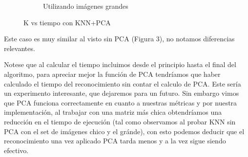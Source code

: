 \begin{figure}[H]
\begin{subfigure}[h]{0.62\linewidth}
\caption{Utilizando imágenes grandes}
\end{subfigure}%
\caption{K vs tiempo con KNN+PCA}
\end{figure}
Este caso es muy similar al visto sin PCA (Figura 3), no notamos diferencias relevantes.

Notese que al calcular el tiempo incluimos desde el principio hasta el final del algoritmo, para apreciar mejor la función de PCA tendríamos que haber calculado el tiempo del reconocimiento sin contar el calculo de PCA. Este sería un experimento interesante, que dejaremos para un futuro.\newline
Sin embargo vimos que PCA funciona correctamente en cuanto a nuestras métricas y por nuestra implementación, al trabajar con una matriz más chica obtendríamos una reducción en el tiempo de ejecución (tal como observamos al probar KNN sin PCA con el set de imágenes chico y el gránde), con esto podemos deducir que el reconocimiento una vez aplicado PCA tarda menos y a la vez sigue siendo efectivo.


